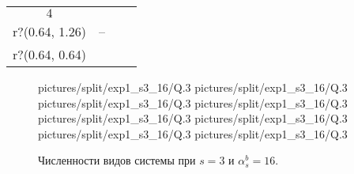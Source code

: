 \begin{center}
\begin{tabular}{|c|c|c|c|}
        \(4\) 
        & \(\begin{matrix} q(73.9,+\infty) \\ r?(0.64, 1.26) \end{matrix}\) 
        & -- 
        & \cellcolor{gray!20}\(\begin{matrix} q(133.16, +\infty) \\ r?(0.64, 0.64) \end{matrix}\) \\ \hline
    \end{tabular}
\end{center}
\begin{figure}[H]
    \centering
       {pictures/split/exp1_s3_16/Q}{.3}
      {pictures/split/exp1_s3_16/Q}{.3}
      {pictures/split/exp1_s3_16/Q}{.3}
      {pictures/split/exp1_s3_16/Q}{.3}
      {pictures/split/exp1_s3_16/Q}{.3}
      {pictures/split/exp1_s3_16/Q}{.3}
     {pictures/split/exp1_s3_16/Q}{.3}
     {pictures/split/exp1_s3_16/Q}{.3}
\caption{Численности видов системы при \(s=3\) и \(\alpha^b_s = 16\).}  \label{fig:split_exp1_s3_16}
\end{figure}


